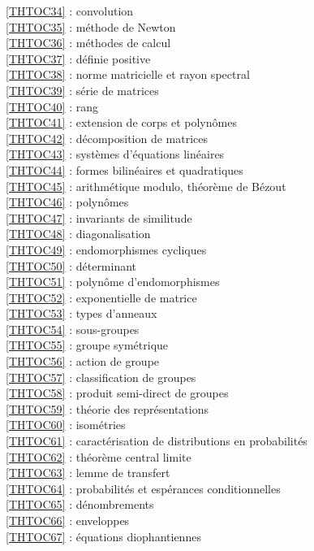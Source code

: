 \ref {THTOC34} : convolution\\
\ref {THTOC35} : méthode de Newton\\
\ref {THTOC36} : méthodes de calcul\\
\ref {THTOC37} : définie positive\\
\ref {THTOC38} : norme matricielle et rayon spectral\\
\ref {THTOC39} : série de matrices\\
\ref {THTOC40} : rang\\
\ref {THTOC41} : extension de corps et polynômes\\
\ref {THTOC42} : décomposition de matrices\\
\ref {THTOC43} : systèmes d'équations linéaires\\
\ref {THTOC44} : formes bilinéaires et quadratiques\\
\ref {THTOC45} : arithmétique modulo, théorème de Bézout\\
\ref {THTOC46} : polynômes\\
\ref {THTOC47} : invariants de similitude\\
\ref {THTOC48} : diagonalisation\\
\ref {THTOC49} : endomorphismes cycliques\\
\ref {THTOC50} : déterminant\\
\ref {THTOC51} : polynôme d'endomorphismes\\
\ref {THTOC52} : exponentielle de matrice\\
\ref {THTOC53} : types d'anneaux\\
\ref {THTOC54} : sous-groupes\\
\ref {THTOC55} : groupe symétrique\\
\ref {THTOC56} : action de groupe\\
\ref {THTOC57} : classification de groupes\\
\ref {THTOC58} : produit semi-direct de groupes\\
\ref {THTOC59} : théorie des représentations\\
\ref {THTOC60} : isométries\\
\ref {THTOC61} : caractérisation de distributions en probabilités\\
\ref {THTOC62} : théorème central limite\\
\ref {THTOC63} : lemme de transfert\\
\ref {THTOC64} : probabilités et espérances conditionnelles\\
\ref {THTOC65} : dénombrements\\
\ref {THTOC66} : enveloppes\\
\ref {THTOC67} : équations diophantiennes\\
